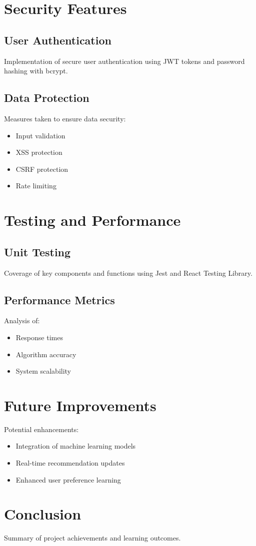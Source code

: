 \documentclass[12pt,a4paper]{article}
\begin{document}
\section{Security Features}
\subsection{User Authentication}
Implementation of secure user authentication using JWT tokens and password hashing with bcrypt.

\subsection{Data Protection}
Measures taken to ensure data security:
\begin{itemize}
    \item Input validation
    \item XSS protection
    \item CSRF protection
    \item Rate limiting
\end{itemize}

\section{Testing and Performance}
\subsection{Unit Testing}
Coverage of key components and functions using Jest and React Testing Library.

\subsection{Performance Metrics}
Analysis of:
\begin{itemize}
    \item Response times
    \item Algorithm accuracy
    \item System scalability
\end{itemize}

\section{Future Improvements}
Potential enhancements:
\begin{itemize}
    \item Integration of machine learning models
    \item Real-time recommendation updates
    \item Enhanced user preference learning
\end{itemize}

\section{Conclusion}
Summary of project achievements and learning outcomes.
\end{document}
